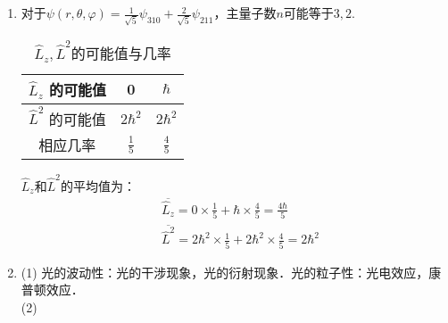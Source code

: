 
\subsection{ }
\begin{enumerate}
\item 对于$\psi(r,\theta,\varphi) = \frac{1}{\sqrt{5}}\psi_{310} + \frac{2}{\sqrt{5}}\psi_{211} $，主量子数$n$可能等于$3,2$.\\
\begin{table}[ht]
\centering
\caption{$\hat{L}_{z},\hat{L}^{2}$的可能值与几率}\label{TJU14A_tab1}
\begin{tabular}{|c|c|c|}
\hline
$\hat{L}_z$ 的可能值 & 0 & $\hbar$  \\
\hline
$\hat{L}^2$ 的可能值 & $2\hbar^{2}$ & $2\hbar^{2}$  \\
\hline
相应几率 & $\frac{1}{5}$ & $\frac{4}{5}$  \\
\hline
\end{tabular}
\end{table}
$\hat{L}_{z}$和$\hat{L}^{2}$的平均值为：\\
\begin{align}
& \overline{\hat{L}_{z}} = 0 \times \frac{1}{5} + \hbar \times \frac{4}{5} = \frac{4\hbar}{5} \\
& \overline{\hat{L}^{2}} = 2\hbar^{2} \times \frac{1}{5} + 2\hbar^{2} \times \frac{4}{5} = 2\hbar^{2}
\end{align}
\item (1) 光的波动性：光的干涉现象，光的衍射现象．光的粒子性：光电效应，康普顿效应．\\
(2)
\end{enumerate}